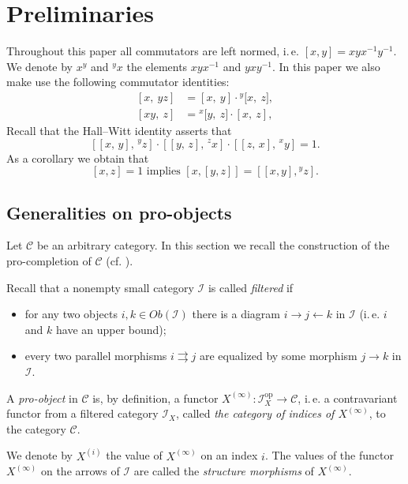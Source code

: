 \documentclass[oneside, 11pt]{amsart}
\numberwithin{equation}{section}
\theoremstyle{definition}
\theoremstyle{remark}
\newcommand{\op}{\mathrm{op}}
\newcommand{\up}[2]{{^{#1}\!{#2}}}
\begin{document}
\section{Preliminaries}
Throughout this paper all commutators are left normed, i.\,e. $[x, y] = xyx^{-1}y^{-1}$. We denote by $x^y$ and $\up{y}x$ the elements $xyx^{-1}$ and $yxy^{-1}$.
In this paper we also make use the following commutator identities:
\begin{align}
\label{eq:comm-mult-rhs}[x,\ yz]& =   [x,\ y] \cdot \up{y}[x,\ z],
\\ \label{eq:comm-mult-lhs}[xy,\ z]& = \up{x}[y,\ z] \cdot [x,\ z],
\end{align}
Recall that the Hall--Witt identity asserts that
\begin{equation} \label{eq:HW} [[x,\,y],\,\up{y} z] \cdot [[y,\,z],\,\up{z} x] \cdot [[z,\,x],\,\up{x} y] = 1. \end{equation}
As a corollary we obtain that
\begin{equation} \label{eq:HW-corr} [x,z] = 1 \text{ implies } [x, [y,z]] = [[x,y],\up{y}z].
\end{equation}

\subsection{Generalities on pro-objects} \label{sec:pro-obj}
Let \(\mathcal C\) be an arbitrary category.
In this section we recall the construction of the pro-completion of \(\mathcal C\) (cf. \cite[Section~6.1]{SK06}).

Recall that a nonempty small category \(\mathcal I\) is called {\it filtered} if
\begin{itemize}
 \item for any two objects \(i, k \in Ob(\mathcal{I})\) there is a diagram \(i \to j \leftarrow k\) in \(\mathcal I\) (i.\,e. $i$ and $k$ have an upper bound);
 \item every two parallel morphisms \(i \rightrightarrows j\) are equalized by some morphism \(j \to k\) in \(\mathcal I\).
\end{itemize}
A {\it pro-object} in \(\mathcal C\) is, by definition, a functor $X^{(\infty)}\colon \mathcal{I}_X^{\op} \to \mathcal{C}$, i.\,e. a contravariant functor from a filtered category \(\mathcal I_X\), called {\it the category of indices of $X^{(\infty)}$}, to the category \(\mathcal C\). 

We denote by \(X^{(i)}\) the value of \(X^{(\infty)}\) on an index \(i\).
The values of the functor $X^{(\infty)}$ on the arrows of $\mathcal{I}$ are called the {\it structure morphisms} of $X^{(\infty)}$.
\end{document}

